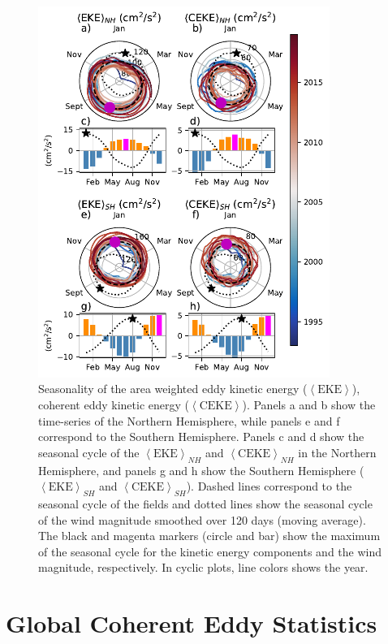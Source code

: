 \documentclass[draft,linenumbers]{agujournal2019}
\newcommand{\EKE}{\textrm{EKE}}
\newcommand{\CEKE}{\textrm{CEKE}}
\begin{document}
	\begin{figure}
	    \centering
	    \includegraphics[width=95mm]{figures/All_polar_plots.pdf}
	    \caption{Seasonality of the area weighted eddy kinetic energy ($\left<\EKE\right>$), coherent eddy kinetic energy ($\left<\CEKE\right>$). 
		Panels a and b show the time-series of the Northern Hemisphere, while panels e and f correspond to the Southern Hemisphere. Panels c and d show the seasonal cycle of the $\left<\EKE\right>_{NH}$ and $\left<\CEKE\right>_{NH}$ in the Northern Hemisphere, and panels g and h show the Southern Hemisphere ($\left<\EKE\right>_{SH}$ and $\left<\CEKE\right>_{SH}$).
		Dashed lines correspond to the seasonal cycle of the fields and dotted lines show the seasonal cycle of the wind magnitude smoothed over 120 days (moving average). 
		The black and magenta markers (circle and bar) show the maximum of the seasonal cycle for the kinetic energy components and the wind magnitude, respectively. In cyclic plots, line colors shows the year.}
	    \label{fig:eddy_energy_polar}
	\end{figure}
	
	\section{Global Coherent Eddy Statistics}
	\label{sec:CE_stats}
\end{document}
